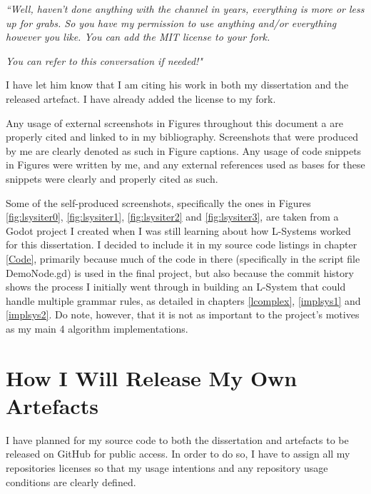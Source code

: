 \textit{``Well, haven't done anything with the channel in years, everything is more or less up for grabs. So you have my permission to use anything and/or everything however you like. You can add the MIT license to your fork.}

\textit{You can refer to this conversation if needed!"}

I have let him know that I am citing his work in both my dissertation and the released artefact. I have already added the license to my fork.\cite{codatGD4LSystemGH}

Any usage of external screenshots in Figures throughout this document a are properly cited and linked to in my bibliography. Screenshots that were produced by me are clearly denoted as such in Figure captions. Any usage of code snippets in Figures were written by me, and any external references used as bases for these snippets were clearly and properly cited as such.

Some of the self-produced screenshots, specifically the ones in Figures \ref{fig:lsysiter0}, \ref{fig:lsysiter1}, \ref{fig:lsysiter2} and \ref{fig:lsysiter3}, are taken from a Godot project I created when I was still learning about how L-Systems worked for this dissertation. I decided to include it in my source code listings in chapter \ref{Code}, primarily because much of the code in there (specifically in the script file DemoNode.gd) is used in the final project, but also because the commit history shows the process I initially went through in building an L-System that could handle multiple grammar rules, as detailed in chapters \ref{lcomplex}, \ref{implsys1} and \ref{implsys2}. Do note, however, that it is not as important to the project's motives as my main 4 algorithm implementations. 

\section{How I Will Release My Own Artefacts} \label{howrelease}

I have planned for my source code to both the dissertation and artefacts to be released on GitHub for public access. In order to do so, I have to assign all my repositories licenses so that my usage intentions and any repository usage conditions are clearly defined. 

